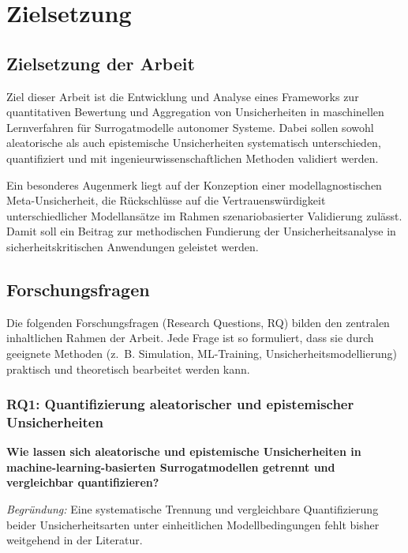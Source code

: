 
\chapter{Zielsetzung}
\label{chapter:zielsetzung}

\section{Zielsetzung der Arbeit}

Ziel dieser Arbeit ist die Entwicklung und Analyse eines Frameworks zur quantitativen Bewertung und Aggregation von Unsicherheiten in maschinellen Lernverfahren für Surrogatmodelle autonomer Systeme. Dabei sollen sowohl aleatorische als auch epistemische Unsicherheiten systematisch unterschieden, quantifiziert und mit ingenieurwissenschaftlichen Methoden validiert werden.

Ein besonderes Augenmerk liegt auf der Konzeption einer modellagnostischen Meta-Unsicherheit, die Rückschlüsse auf die Vertrauenswürdigkeit unterschiedlicher Modellansätze im Rahmen szenariobasierter Validierung zulässt. Damit soll ein Beitrag zur methodischen Fundierung der Unsicherheitsanalyse in sicherheitskritischen Anwendungen geleistet werden.

\section{Forschungsfragen}

Die folgenden Forschungsfragen (Research Questions, RQ) bilden den zentralen inhaltlichen Rahmen der Arbeit. Jede Frage ist so formuliert, dass sie durch geeignete Methoden (z.~B. Simulation, ML-Training, Unsicherheitsmodellierung) praktisch und theoretisch bearbeitet werden kann. 

\subsection*{RQ1: Quantifizierung aleatorischer und epistemischer Unsicherheiten}

\textbf{Wie lassen sich aleatorische und epistemische Unsicherheiten in machine-learning-basierten Surrogatmodellen getrennt und vergleichbar quantifizieren?}

\emph{Begründung:} Eine systematische Trennung und vergleichbare Quantifizierung beider Unsicherheitsarten unter einheitlichen Modellbedingungen fehlt bisher weitgehend in der Literatur.

